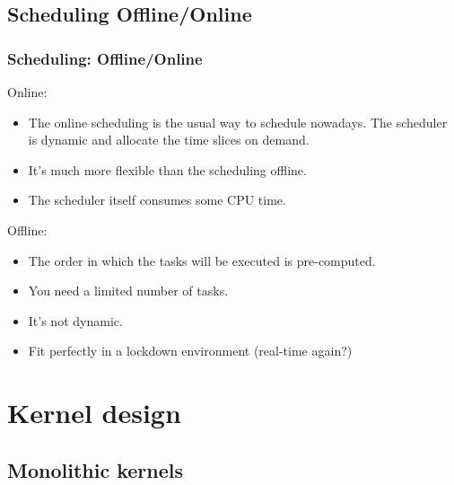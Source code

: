 \subsection{Scheduling Offline/Online}
\begin{frame}
  \frametitle{Scheduling: Offline/Online}
        Online:
        \begin{itemize}
                \item The online scheduling is the usual way to schedule nowadays. The scheduler is dynamic and allocate the time slices on demand.
                \item It's much more flexible than the scheduling offline.
                \item The scheduler itself consumes some CPU time.
        \end{itemize}
        \-
        Offline:
        \begin{itemize}
                \item The order in which the tasks will be executed is pre-computed.
                \item You need a limited number of tasks.
                \item It's not dynamic.
                \item Fit perfectly in a lockdown environment (real-time again?)
        \end{itemize}
\end{frame}

%
%

\section{Kernel design}
\subsection{Monolithic kernels}

%
%

